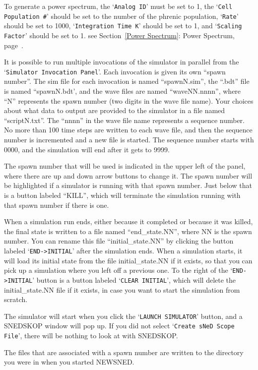 \documentclass[12pt,openany,oneside]{book}
\newcommand{\tiw}[1]{\mbox{#1}}
\newcommand{\tisamp}[1]{`\texttt{#1}'}
\newcommand{\tixref}[1]{see Section~\ref{#1}: #1, page~\pageref{#1}}
\begin{document}
To generate a power spectrum, the \tisamp{Analog ID} must be set to 1,
the \tisamp{Cell Population \#} should be set to the number of the
phrenic population, \tisamp{Rate} should be set to 1000,
\tisamp{Integration Time K} should be set to 1, and \tisamp{Scaling
Factor} should be set to 1.  \tixref{Power Spectrum}.

It is possible to run multiple invocations of the simulator in
parallel from the \tisamp{Simulator Invocation Panel}.  Each invocation
is given its own ``spawn number''.  The sim file for each invocation
is named ``spawnN.sim'', the ``.bdt'' file is named ``spawnN.bdt', and
the wave files are named ``waveNN.nnnn'', where ``N'' represents the
spawn number (two digits in the wave file name).  Your choices about
what data to output are provided to the simulator in a file named
``scriptN.txt''.  The ``nnnn'' in the wave file name represents a
sequence number.  No more than 100 time steps are written to each wave
file, and then the sequence number is incremented and a new file is
started.  The sequence number starts with 0000, and the simulation
will end after it gets to 9999.

The spawn number that will be used is indicated in the upper left of
the panel, where there are up and down arrow buttons to change it.
The spawn number will be highlighted if a simulator is running with
that spawn number.  Just below that is a button labeled ``KILL'',
which will terminate the simulation running with that spawn number if
there is one.

When a simulation run ends, either because it completed or because it
was killed, the final state is written to a file named
``end\_state.NN'', where NN is the spawn number.  You can rename this
file ``initial\_state.NN'' by clicking the button labeled
\tisamp{END->INITIAL} after the simulation ends.  When a simulation starts,
it will load its initial state from the file initial\_state.NN if it
exists, so that you can pick up a simulation where you left off a
previous one.  To the right of the \tisamp{END->INITIAL} button is a button labeled
\tisamp{CLEAR INITIAL}, which will delete the initial\_state.NN file if it
exists, in case you want to start the simulation from scratch.

The simulator will start when you click the \tiw{\tisamp{LAUNCH
SIMULATOR}} button, and a SNEDSKOP window will pop up.  If you did not
select \tisamp{Create sNeD Scope File}, there will be nothing to look at
with SNEDSKOP.

The files that are associated with a spawn number are written to the
directory you were in when you started NEWSNED.
\end{document}
